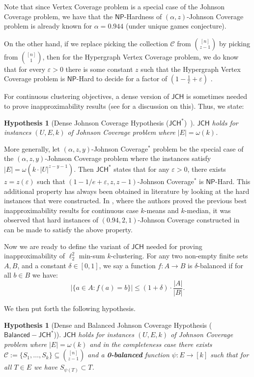 \documentclass[10pt,a4paper]{amsart}
\newtheorem{hypothesis}[theorem]{Hypothesis}
\newcommand{\hyplab}[1]{\label{hyp:#1}}
\newcommand{\eps}{\varepsilon}
\newcommand{\JCH}{$\mathsf{JCH}$\xspace}
\newcommand{\JCHD}{$\mathsf{JCH}^*$\xspace}
\newcommand{\JCHDB}{$\mathsf{Balanced-JCH}^*$\xspace}
\newcommand{\jc}{Johnson Coverage\xspace}
\newcommand{\jcd}{Johnson Coverage$^*$\xspace}
\newcommand{\C}{\mathcal{C}}
\newcommand{\NP}{$\mathsf{NP}$\xspace}
\begin{document}
Note that since Vertex Coverage problem is a special case of the \jc problem, we have that the \NP-Hardness of $(\alpha,z)$-Johnson Coverage problem is already known for $\alpha=0.944$ \cite{AKS11} (under unique games conjecture). 

On the other hand,  if we replace picking the collection $\C$ from $\binom{[n]}{z-1}$ by picking from $\binom{[n]}{1}$, then for the Hypergraph Vertex Coverage problem, we do know that for every $\eps>0$ there is some constant $z$ such that the Hypergraph Vertex Coverage problem is \NP-Hard to decide for a factor of $\left(1-\frac{1}{e}+\varepsilon\right)$ \cite{F98}. 

For continuous clustering objectives, a dense version of \JCH is sometimes needed to prove inapproximability results (see \cite{Cohen-AddadSL22} for a discussion on this). Thus, we state: 

\begin{hypothesis}[Dense Johnson Coverage Hypothesis (\JCHD)~\cite{Cohen-AddadSL22}]
\JCH holds for instances $(U,E,k)$ of \jc problem where $|E|=\omega(k)$.\hyplab{hyp:jchd}
\end{hypothesis}

More generally, let $(\alpha, z, y)$-\jcd problem be the special case of the 
$(\alpha, z, y)$-\jc problem where the instances satisfy $|E| = \omega(k \cdot |U|^{z - y - 1})$. 
Then \JCHD states that for any $\eps > 0$, there exists $z = z(\eps)$ such that 
$(1-1/e + \eps, z, z-1)$-\jcd is \NP-Hard. 
This additional property has always been obtained in literature by looking at the hard instances that were constructed. 
In \cite{Cohen-AddadS19}, where the authors proved the previous best inapproximability results for continuous case $k$-means and $k$-median, 
it was observed that hard instances of $(0.94,2,1)$-\jc constructed in~\cite{AKS11} can be made to satisfy the above property.

Now we are ready to define the variant of \JCH needed for proving inapproximability of $\ell_2^2$ min-sum $k$-clustering.
For any two non-empty finite sets $A,B$, and a constant $\delta\in [0,1]$, we say a function $f:A\to B$ is $\delta$-balanced if for all $b\in B$ we have: 
$$  \left|\{a\in A: f(a)=b\}\right| \le (1+\delta)\cdot \frac{|A|}{|B|}.
$$


We then put forth the following hypothesis.

\begin{hypothesis}[Dense and Balanced Johnson Coverage Hypothesis (\JCHDB)]\hyplab{hyp:jchdb}
\JCH holds for instances $(U,E,k)$ of \jc problem where $|E|=\omega(k)$ and in the completeness case there   exists $\C:=\{S_1,\ldots ,S_k\}\subseteq  \binom{[n]}{z-1}$  and a {\bf 0-balanced} function $\psi:E\to [k]$ such that for all $T\in E$ we have $S_{\psi(T)}\subset T$.
\end{hypothesis}
\end{document}
